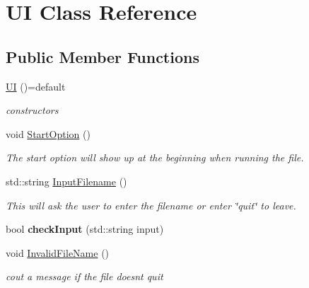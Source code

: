 \hypertarget{classUI}{}\section{UI Class Reference}
\label{classUI}
\subsection*{Public Member Functions}
\begin{DoxyCompactItemize}
\item 
\mbox{\label{classUI_a3cd5131e957f45588b448c5c55ed0adf}} 
\hyperlink{classUI_a3cd5131e957f45588b448c5c55ed0adf}{UI} ()=default
\begin{DoxyCompactList}\small\item\em constructors \end{DoxyCompactList}\item 
\mbox{\label{classUI_ade684e1af6cdcc9ad9a9f4049294d5f7}} 
void \hyperlink{classUI_ade684e1af6cdcc9ad9a9f4049294d5f7}{Start\+Option} ()
\begin{DoxyCompactList}\small\item\em The start option will show up at the beginning when running the file. \end{DoxyCompactList}\item 
std\+::string \hyperlink{classUI_aac4ec5438f211612234d8f9be155eaf2}{Input\+Filename} ()
\begin{DoxyCompactList}\small\item\em This will ask the user to enter the filename or enter \char`\"{}quit\char`\"{} to leave. \end{DoxyCompactList}\item 
\mbox{\label{classUI_a81e54c22892df22c6b67a10e4d0e58e6}} 
bool {\bfseries check\+Input} (std\+::string input)
\item 
\mbox{\label{classUI_a8f4736f8a5097a1f234678ac85544b28}} 
void \hyperlink{classUI_a8f4736f8a5097a1f234678ac85544b28}{Invalid\+File\+Name} ()
\begin{DoxyCompactList}\small\item\em cout a message if the file doesn\textquotesingle{}t quit \end{DoxyCompactList}\item 
\mbox{\label{classUI_a8d1d1f3df8d204f641c085a4d3730c1b}} 

\end{DoxyCompactItemize}
